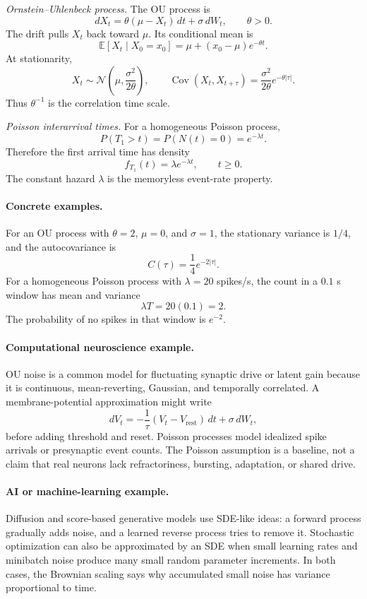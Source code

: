 \emph{Ornstein--Uhlenbeck process.} The OU process is
\[
dX_t=\theta(\mu-X_t)\,dt+\sigma\,dW_t,\qquad \theta>0.
\]
The drift pulls \(X_t\) back toward \(\mu\). Its conditional mean is
\[
\mathbb E[X_t\mid X_0=x_0]=\mu+(x_0-\mu)e^{-\theta t}.
\]
At stationarity,
\[
X_t\sim\mathcal N\!\left(\mu,\frac{\sigma^2}{2\theta}\right),
\qquad
\operatorname{Cov}(X_t,X_{t+\tau})=\frac{\sigma^2}{2\theta}e^{-\theta|\tau|}.
\]
Thus \(\theta^{-1}\) is the correlation time scale.

\emph{Poisson interarrival times.} For a homogeneous Poisson process,
\[
P(T_1>t)=P(N(t)=0)=e^{-\lambda t}.
\]
Therefore the first arrival time has density
\[
f_{T_1}(t)=\lambda e^{-\lambda t},\qquad t\geq0.
\]
The constant hazard \(\lambda\) is the memoryless event-rate property.

\paragraph{Concrete examples.}
For an OU process with \(\theta=2\), \(\mu=0\), and \(\sigma=1\), the stationary variance is \(1/4\), and the autocovariance is
\[
C(\tau)=\frac14 e^{-2|\tau|}.
\]
For a homogeneous Poisson process with \(\lambda=20\) spikes/s, the count in a \(0.1\) s window has mean and variance
\[
\lambda T=20(0.1)=2.
\]
The probability of no spikes in that window is \(e^{-2}\).

\paragraph{Computational neuroscience example.}
OU noise is a common model for fluctuating synaptic drive or latent gain because it is continuous, mean-reverting, Gaussian, and temporally correlated. A membrane-potential approximation might write
\[
dV_t=-\frac{1}{\tau}(V_t-V_{\mathrm{rest}})\,dt+\sigma\,dW_t,
\]
before adding threshold and reset. Poisson processes model idealized spike arrivals or presynaptic event counts. The Poisson assumption is a baseline, not a claim that real neurons lack refractoriness, bursting, adaptation, or shared drive.

\paragraph{AI or machine-learning example.}
Diffusion and score-based generative models use SDE-like ideas: a forward process gradually adds noise, and a learned reverse process tries to remove it. Stochastic optimization can also be approximated by an SDE when small learning rates and minibatch noise produce many small random parameter increments. In both cases, the Brownian scaling says why accumulated small noise has variance proportional to time.

